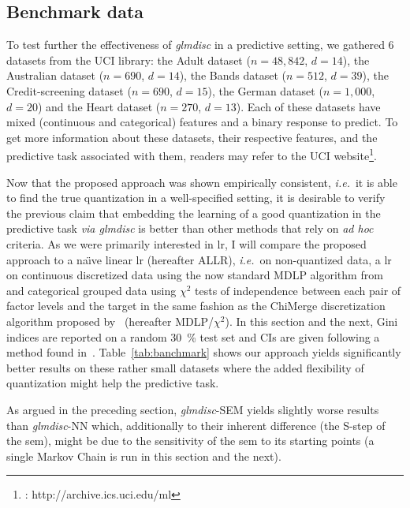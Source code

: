 \subsection{Benchmark data} \label{subsec:exp_benchmark}

To test further the effectiveness of \textit{glmdisc} in a predictive setting, we gathered 6 datasets from the UCI library: the Adult dataset ($n=48,842$, $d=14$), the Australian dataset ($n=690$, $d=14$), the Bands dataset ($n=512$, $d=39$), the Credit-screening dataset ($n=690$, $d=15$), the German dataset ($n=1,000$, $d=20$) and the Heart dataset ($n=270$, $d=13$). Each of these datasets have mixed (continuous and categorical) features and a binary response to predict. To get more information about these datasets, their respective features, and the predictive task associated with them, readers may refer to the UCI website\footnote{\cite{Dua:2017} : http://archive.ics.uci.edu/ml}.

Now that the proposed approach was shown empirically consistent, \textit{i.e.}\ it is able to find the true quantization in a well-specified setting, it is desirable to verify the previous claim that embedding the learning of a good quantization in the predictive task \textit{via glmdisc} is better than other methods that rely on \textit{ad hoc} criteria. As we were primarily interested in \gls{lr}, I will compare the proposed approach to a na\"{\i}ve linear \gls{lr} (hereafter ALLR), \textit{i.e.}\ on non-quantized data, a \gls{lr} on continuous discretized data using the now standard MDLP algorithm from~\cite{fayyad1993multi} and categorical grouped data using $\chi^2$ tests of independence between each pair of factor levels and the target in the same fashion as the ChiMerge discretization algorithm proposed by~\cite{kerber1992chimerge} (hereafter MDLP/$\chi^2$). In this section and the next, Gini indices are reported on a random 30~\% test set and CIs are given following a method found in~\cite{sun2014fast}. Table~\ref{tab:banchmark} shows our approach yields significantly better results on these rather small datasets where the added flexibility of quantization might help the predictive task.

As argued in the preceding section, \textit{glmdisc}-SEM yields slightly worse results than \textit{glmdisc}-NN which, additionally to their inherent difference (the S-step of the \gls{sem}), might be due to the sensitivity of the \gls{sem} to its starting points (a single Markov Chain is run in this section and the next).

